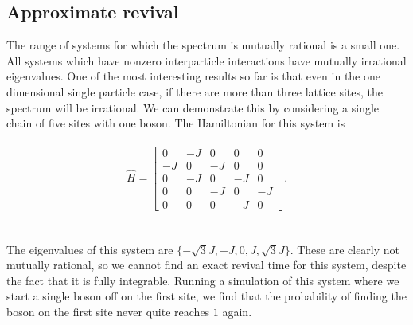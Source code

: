 \documentclass[a4paper,10pt]{article}
\begin{document}
\subsection{Approximate revival}
The range of systems for which the spectrum  is mutually rational is a small one. 
All systems which have nonzero interparticle interactions have mutually irrational eigenvalues. One of the most interesting results so far is that even in the one dimensional single particle case,
if there are more than three lattice sites, the spectrum will be irrational. We can demonstrate this by considering a single chain of five sites with one boson. The Hamiltonian for this 
system is \\\\
\begin{equation}
\hat{H}= \begin{bmatrix}
 0 & -J & 0 & 0 & 0\\
 -J & 0 & -J & 0 & 0\\
 0 & -J & 0 & -J & 0\\
 0 & 0 & -J & 0 & -J\\
 0 & 0 & 0 & -J & 0
 \end{bmatrix}.
\end{equation}
\\\\
The eigenvalues of this system are $\{-\sqrt{3}J,-J,0,J,\sqrt{3}J\}$. These are clearly not mutually rational, so we cannot find an exact revival time for this system, despite the fact that it is 
fully integrable. Running a simulation of this system where we start a single boson off on the first site, we find that the probability of finding the boson on the first site never quite reaches $1$ again.
\end{document}

